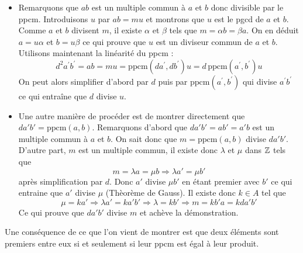 \begin{propn}
\begin{demo}
 \begin{itemize}
 \item Remarquons que $ab$ est un multiple commun à $a$ et $b$ donc divisible par le ppcm. Introduisons $u$ par $ab=mu$ et montrons que $u$ est le pgcd de $a$ et $b$.\newline
Comme $a$ et $b$ divisent $m$, il existe $\alpha$ et $\beta$ tels que $m=\alpha b = \beta a$. On en déduit $a=u \alpha$ et $b=u \beta$ ce qui prouve que $u$ est un diviseur commun de $a$ et $b$.\newline
Utilisons maintenant la linéarité du ppcm :
\begin{displaymath}
 d^2 a^\prime b^\prime = ab=mu=\text{ppcm}(da^\prime,db^\prime)u=d\,\text{ppcm}(a^\prime,b^\prime)u
\end{displaymath}
On peut alors simplifier d'abord par $d$ puis par $\text{ppcm}(a^\prime,b^\prime)$ qui divise $a^\prime b^\prime$ ce qui entraîne que $d$ divise $u$.
\item Une autre manière de procéder est de montrer directement que $da'b'=\text{ppcm}(a,b)$.\newline
Remarquons d'abord que $da'b'=ab'=a'b$ est un multiple commun à $a$ et $b$. On sait donc que $m=\text{ppcm}(a,b)$ divise $da'b'$.\newline
D'autre part, $m$ est un multiple commun, il existe donc $\lambda$ et $\mu$ dans $\mathbb{Z}$ tels que 
\begin{displaymath}
m=\lambda a = \mu b \Rightarrow \lambda a' = \mu b' 
\end{displaymath}
après simplification par $d$. Donc $a'$ divise $\mu b'$ en étant premier avec $b'$ ce qui entraine que $a'$ divise $\mu$ (Thèorème de Gauss). Il existe donc $k\in A$ tel que
\begin{displaymath}
 \mu = k a' \Rightarrow  \lambda a' =  k a'b' \Rightarrow \lambda = kb' 
\Rightarrow m = k b' a = k da' b'
\end{displaymath}
Ce qui prouve que $da'b'$ divise $m$ et achève la démonstration.
\end{itemize}
\end{demo}
Une conséquence de ce que l'on vient de montrer est que deux éléments sont premiers entre eux si et seulement si leur ppcm est égal à leur produit.


\end{propn}
